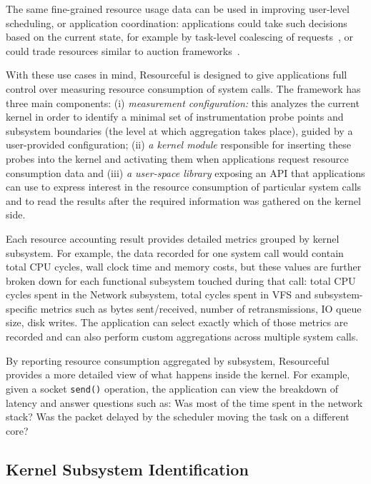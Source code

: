 \documentclass[letterpaper,twocolumn,10pt]{article}
\newcommand{\pname}{Resourceful}
\begin{document}
The same fine-grained resource usage data can be used in improving user-level scheduling, or application coordination: applications could take such decisions based on the current state, for example by task-level coalescing of requests~\cite{dogar2014}, or could trade resources similar to auction frameworks~\cite{ShiAuction2014}. 

With these use cases in mind, \pname{ }is designed to give applications full
control over measuring resource consumption of system calls. The framework has
three main components: (i) \textit{measurement configuration:} this analyzes the
current kernel in order to identify a minimal set of instrumentation probe
points and subsystem boundaries (the level at which aggregation takes place),
guided by a user-provided configuration; (ii) \textit{a kernel module}
responsible for inserting these probes into the kernel and activating them when
applications request resource consumption data and (iii) \textit{a user-space
library} exposing an API that applications can use to express interest in the
resource consumption of particular system calls and to read the results after
the required information was gathered on the kernel side.

Each resource accounting result provides detailed metrics grouped by kernel
subsystem. For example, the data recorded for one system call would contain
total CPU cycles, wall clock time and memory costs, but these
values are further broken down for each functional subsystem touched during that call: total
CPU cycles spent in the Network subsystem, total cycles spent in VFS and
subsystem-specific metrics such as bytes sent/received, number of
retransmissions, IO queue size, disk writes. The application can select exactly
which of those metrics are recorded and can also perform custom aggregations
across multiple system calls.

By reporting resource consumption aggregated by subsystem, Resourceful provides
a more detailed view of what happens inside the kernel. For example, given a
socket \texttt{send()} operation, the application can view the breakdown
of latency and answer questions such as: Was most of the time spent in the
network stack? Was the packet delayed by the scheduler moving the task on a
different core?

\subsection{Kernel Subsystem Identification}
\end{document}
